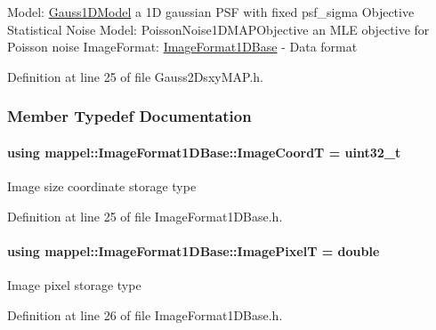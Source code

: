 Model\+: \hyperlink{classmappel_1_1Gauss1DModel}{Gauss1\+D\+Model} a 1D gaussian P\+SF with fixed psf\+\_\+sigma Objective Statistical Noise Model\+: Poisson\+Noise1\+D\+M\+A\+P\+Objective an M\+LE objective for Poisson noise Image\+Format\+: \hyperlink{classmappel_1_1ImageFormat1DBase}{Image\+Format1\+D\+Base} -\/ Data format 

Definition at line 25 of file Gauss2\+Dsxy\+M\+A\+P.\+h.



\subsubsection{Member Typedef Documentation}
\paragraph[{\texorpdfstring{Image\+CoordT}{ImageCoordT}}]{\setlength{\rightskip}{0pt plus 5cm}using {\bf mappel\+::\+Image\+Format1\+D\+Base\+::\+Image\+CoordT} =  uint32\+\_\+t\hspace{0.3cm}{\ttfamily [inherited]}}\hypertarget{classmappel_1_1ImageFormat1DBase_a82ab3168eb1a87eaeb3e7c919188e9fc}{}\label{classmappel_1_1ImageFormat1DBase_a82ab3168eb1a87eaeb3e7c919188e9fc}
Image size coordinate storage type 

Definition at line 25 of file Image\+Format1\+D\+Base.\+h.

\paragraph[{\texorpdfstring{Image\+PixelT}{ImagePixelT}}]{\setlength{\rightskip}{0pt plus 5cm}using {\bf mappel\+::\+Image\+Format1\+D\+Base\+::\+Image\+PixelT} =  double\hspace{0.3cm}{\ttfamily [inherited]}}\hypertarget{classmappel_1_1ImageFormat1DBase_a156fe500fd249cb4b77bdb0abc0dd0ea}{}\label{classmappel_1_1ImageFormat1DBase_a156fe500fd249cb4b77bdb0abc0dd0ea}
Image pixel storage type 

Definition at line 26 of file Image\+Format1\+D\+Base.\+h.

